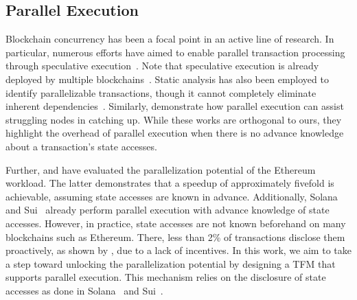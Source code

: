 \subsection{Parallel Execution}

Blockchain concurrency has been a focal point in an active line of research. In particular, numerous efforts have aimed to enable parallel transaction processing through speculative execution~\cite{sergey2017concurrent,zhang2018enabling,amiri2019parblockchain,dickerson2017adding,anjana2022optsmart,gelashvili2022block,chen2021forerunner,saraph2019empirical}. Note that speculative execution is already deployed by multiple blockchains~\cite{aptos,sei_protocol,monad}. Static analysis has also been employed to identify parallelizable transactions, though it cannot completely eliminate inherent dependencies~\cite{pirlea2021practical,murgia2021theory}. Similarly, \citet{neiheiser2024pythia} demonstrate how parallel execution can assist struggling nodes in catching up. While these works are orthogonal to ours, they highlight the overhead of parallel execution when there is no advance knowledge about a transaction's state accesses.

Further, \citet{saraph2019empirical} and \citet{heimbach2023defi} have evaluated the parallelization potential of the Ethereum workload. The latter demonstrates that a speedup of approximately fivefold is achievable, assuming state accesses are known in advance. Additionally, Solana~\cite{solana} and Sui~\cite{sui} already perform parallel execution with advance knowledge of state accesses. However, in practice, state accesses are not known beforehand on many blockchains such as Ethereum. There, less than 2\% of transactions disclose them proactively, as shown by \citet{heimbach2023dissecting}, due to a lack of incentives. In this work, we aim to take a step toward unlocking the parallelization potential by designing a TFM that supports parallel execution. This mechanism relies on the disclosure of state accesses as done in Solana~\cite{solana} and Sui~\cite{sui}.